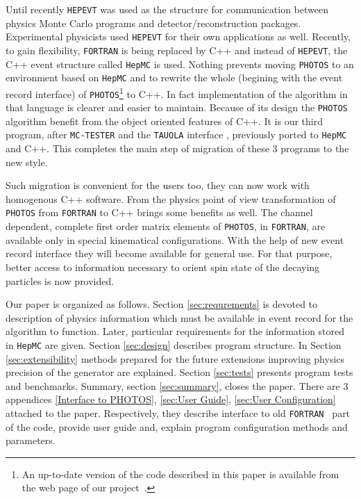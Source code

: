\documentclass[]{Photos_interface_design}
\begin{document}
Until recently {\tt HEPEVT} \cite{Altarelli:1989wu} was used as the structure for 
communication between physics Monte Carlo programs and detector/reconstruction 
packages. Experimental physicists used {\tt HEPEVT} 
for their own applications  as well. Recently, to gain  flexibility, {\tt FORTRAN} is being replaced by C++ and 
instead of {\tt HEPEVT}, the C++ event structure called {\tt HepMC} \cite{Dobbs:2001ck}
is used. Nothing prevents 
moving {\tt PHOTOS} to an environment based on  {\tt HepMC}
and to rewrite the whole (begining with the event record interface)
of {\tt PHOTOS}\footnote{An up-to-date version of the code described in this paper is
available from the web page of our project~\cite{photosC++}. 
  }
 to C++. In fact implementation of the algorithm in that language 
is clearer and easier to
 maintain. Because of its design the {\tt PHOTOS} algorithm benefit from the object 
oriented features of C++. It is our third program, after {\tt MC-TESTER} \cite{Davidson:2008ma}
and the {\tt TAUOLA} interface \cite{Davidson:2010rw}, previously ported to {\tt HepMC} and C++.
This completes the main step of migration of these 3 programs to the new style.

Such migration is convenient for the users too,  they can now work
with  homogenous C++ software. From the physics point of view transformation 
of {\tt PHOTOS} 
from {\tt FORTRAN} to C++  brings some benefits as well.
The channel dependent, complete first order matrix elements of {\tt PHOTOS}, in {\tt FORTRAN},
 are available only 
in special
kinematical configurations. With the help of new event record interface they will become
available for general use.
For that purpose, better access to information necessary to orient spin state of the decaying particles
is now provided.



Our paper is organized as follows. Section \ref{sec:requrements} is devoted
to description of physics information which must be available in event
record for the algorithm to function. Later, particular requirements for the 
information stored in {\tt HepMC} are given. Section \ref{sec:design} describes
program structure. In Section  \ref{sec:extensibility} methods prepared for the
future extensions improving physics precision of the generator are explained.
Section \ref{sec:tests} presents program tests and benchmarks. 
Summary, section \ref{sec:summary}, closes the paper.
There are 3 appendices \ref{Interface to PHOTOS}, 
\ref{sec:User Guide}, \ref{sec:User Configuration} attached to the paper.
Respectively, they describe interface to old {\tt FORTRAN } part of the code,
provide user guide and, explain program configuration methods and parameters. 
\end{document}
